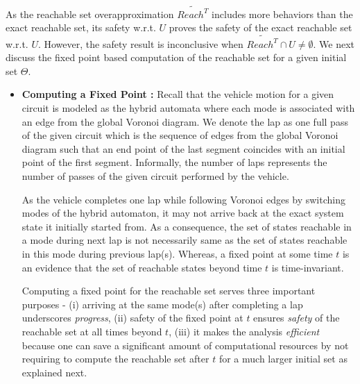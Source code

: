 As the reachable set overapproximation $\tilde{Reach^T}$ includes more behaviors than the exact reachable set, its safety w.r.t. $U$ proves the safety of the exact reachable set w.r.t. $U$. However, the safety result is inconclusive when $\tilde{Reach^T} \cap U \neq  \emptyset$. We next discuss the fixed point based computation of the reachable set for a given initial set $\Theta$. 

\begin{itemize}[leftmargin=*]
\item \textbf{Computing a Fixed Point :} Recall that the vehicle motion for a given circuit is modeled as the hybrid automata where each mode is associated with an edge from the global Voronoi diagram.
%
We denote the lap as one full pass of the given circuit which is the sequence of edges from the global Voronoi diagram such that an end point of the last segment coincides with an initial point of the first segment. Informally, the number of laps represents the number of passes of the given circuit performed by the vehicle.
%

As the vehicle completes one lap while following Voronoi edges by switching modes of the hybrid automaton, it may not arrive back at the exact system state it initially started from. As a consequence, the set of states reachable in a mode during next lap is not necessarily same as the set of states reachable in this mode during previous lap(s). Whereas, a fixed point at some time $t$ is an evidence that the set of reachable states beyond time $t$ is time-invariant. 

Computing a fixed point for the reachable set serves three important purposes - (i) arriving at the same mode(s) after completing a lap underscores \emph{progress}, (ii) safety of the fixed point at $t$ ensures \emph{safety} of the reachable set at all times beyond $t$, (iii) it makes the analysis \emph{efficient} because one can save a significant amount of computational resources by not requiring to compute the reachable set after $t$ for a much larger initial set as explained next.

%
%


\end{itemize}
